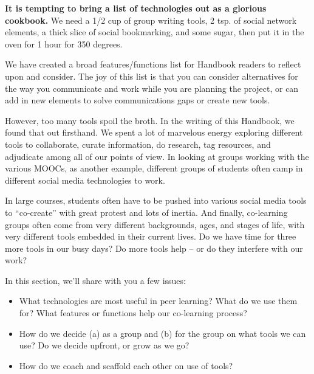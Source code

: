 %
\textbf{It is tempting to bring a list of technologies out as a glorious
cookbook.} We need a 1/2 cup of group writing tools, 2 tsp. of social
network elements, a thick slice of social bookmarking, and some sugar,
then put it in the oven for 1 hour for 350 degrees.

We have created a broad features/functions list for Handbook readers to
reflect upon and consider. The joy of this list is that you can consider
alternatives for the way you communicate and work while you are planning
the project, or can add in new elements to solve communications gaps or
create new tools.

However, too many tools spoil the broth. In the writing of this
Handbook, we found that out firsthand. We spent a lot of marvelous
energy exploring different tools to collaborate, curate information, do
research, tag resources, and adjudicate among all of our points of view.
In looking at groups working with the various MOOCs, as another example,
different groups of students often camp in different social media
technologies to work.

In large courses, students often have to be pushed into various social
media tools to ``co-create'' with great protest and lots of inertia. And
finally, co-learning groups often come from very different backgrounds,
ages, and stages of life, with very different tools embedded in their
current lives. Do we have time for three more tools in our busy days? Do
more tools help -- or do they interfere with our work?

In this section, we'll share with you a few issues:

\begin{itemize}
\itemsep1pt\parskip0pt
\item
  What technologies are most useful in peer learning? What do we use
  them for? What features or functions help our co-learning process?
\end{itemize}

\begin{itemize}
\itemsep1pt\parskip0pt
\item
  How do we decide (a) as a group and (b) for the group on what tools we
  can use? Do we decide upfront, or grow as we go?
\end{itemize}

\begin{itemize}
\itemsep1pt\parskip0pt
\item
  How do we coach and scaffold each other on use of tools?
\end{itemize}

